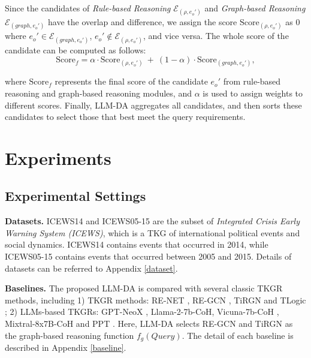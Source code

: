 \documentclass{article}
\begin{document}
Since the candidates of \textit{Rule-based Reasoning} $\mathcal{E}_{(\rho, e_o')}$ and \textit{Graph-based Reasoning} $\mathcal{E}_{(graph, e_o')}$ have the overlap and difference, we assign the score $\text{Score}_{(\rho, e_o')}$ as $0$ where $e_o'\in \mathcal{E}_{(graph, e_o')}$, $e_o'\notin \mathcal{E}_{(\rho, e_o')}$, and vice versa. 
The whole score of the candidate can be computed as follows:
\begin{equation}
    \text{Score}_f = \alpha \cdot \text{Score}_{(\rho, e_o')}\ +\ (1-\alpha) \cdot \text{Score}_{(graph, e_o')},
\end{equation}

where $\text{Score}_f$ represents the final score of the candidate $e_o'$ from rule-based reasoning and graph-based reasoning modules, and $\alpha$ is used to assign weights to different scores. 
Finally, LLM-DA aggregates all candidates, and then sorts these candidates to select those that best meet the query requirements. 

\section{Experiments}

\subsection{Experimental Settings}
    
\textbf{Datasets.} ICEWS14 \cite{Learning2018} and 
ICEWS05-15 \cite{Learning2018} are the subset of
\textit{Integrated Crisis Early 
Warning System (ICEWS)}, which is a TKG of international political events and social dynamics. 
ICEWS14 contains events that occurred in 2014, while ICEWS05-15 contains events that occurred between 2005 and 2015.  
Details of datasets can be referred to Appendix \ref{dataset}.

\textbf{Baselines.} The proposed LLM-DA is compared with several classic TKGR methods, including 1) TKGR methods: RE-NET \citep{jin2019recurrent}, RE-GCN \citep{li2021temporal}, TiRGN \citep{li2022tirgn} and TLogic \citep{liu2022tlogic}; 2) LLMs-based TKGRs: GPT-NeoX \citep{lee2023temporal}, Llama-2-7b-CoH, Vicuna-7b-CoH \citep{luo2024chain}, Mixtral-8x7B-CoH \citep{xia2024enhancing} and PPT \citep{xu2023pre}. Here, LLM-DA selects RE-GCN and TiRGN as the graph-based reasoning function $f_g(Query)$.
The detail of each baseline is described in  Appendix \ref{baseline}.
\end{document}
